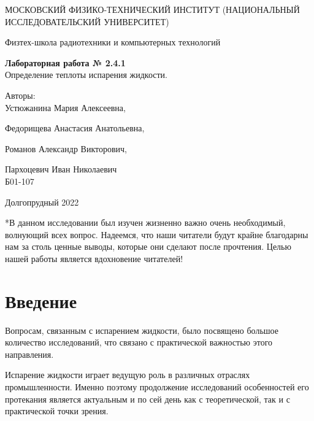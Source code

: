 \documentclass[a4paper,10pt]{article} %
\date{\today}
\begin{document}
\begin{titlepage}
	\begin{center}
		{\large МОСКОВСКИЙ ФИЗИКО-ТЕХНИЧЕСКИЙ ИНСТИТУТ (НАЦИОНАЛЬНЫЙ ИССЛЕДОВАТЕЛЬСКИЙ УНИВЕРСИТЕТ)}
	\end{center}
	\begin{center}
		{\large Физтех-школа радиотехники и компьютерных технологий}
	\end{center}
	
	
	\vspace{4cm}
	{\huge
		\begin{center}
			{\bf Лабораторная работа № 2.4.1}\\
			 Определение теплоты испарения жидкости.
		\end{center}
	}
	\vspace{3cm}
	\begin{flushright}
		{\LARGE Авторы:\\ Устюжанина Мария Алексеевна,

		Федорищева Анастасия Анатольевна, 

		Романов Александр Викторович, 

		Пархоцевич Иван Николаевич\\
			\vspace{0.3cm}
			Б01-107}
	\end{flushright}
	\vspace{4.5 cm}
	\begin{center}
		Долгопрудный 2022

	\vspace{1 cm}

		 *В данном исследовании был изучен жизненно важно очень необходимый, волнующий всех вопрос. 
		 Надеемся, что наши читатели будут крайне благодарны нам за столь ценные выводы, которые они сделают 
		 после прочтения. Целью нашей работы является вдохновение читателей!

	\end{center}
\end{titlepage}

\section{Введение}

Вопросам, связанным с испарением жидкости, было посвящено большое количество исследований, что 
связано с практической важностью этого направления. 

Испарение жидкости играет ведущую роль в различных отраслях промышленности. Именно поэтому продолжение исследований 
особенностей его протекания является актуальным и по сей день как с теоретической, так и с практической точки 
зрения.
\end{document}
